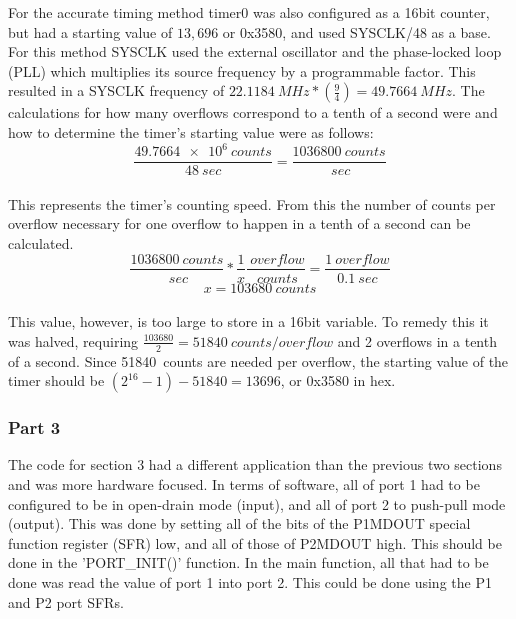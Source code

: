 \documentclass[12pt]{article}
\begin{document}
For the accurate timing method timer0 was also configured as a 16bit counter, but had a starting value of $13,696$ or 0x3580, and used SYSCLK/48 as a base. For this method SYSCLK used the external oscillator and the phase-locked loop (PLL) which multiplies its source frequency by a programmable factor. This resulted in a SYSCLK frequency of \begin{math}
	\SI{22.1184}{MHz}*\left(\frac{9}{4}\right) = \SI{49.7664}{MHz}
\end{math}.  The calculations for how many overflows correspond to a tenth of a second were and how to determine the timer's starting value were as follows:\\
\begin{equation}
	\frac{\SI{49.7664e6}{counts}}{\SI{48}{sec}} = \frac{\SI{1036800}{counts}}{\SI{}{sec}}
\end{equation}\\
This represents the timer's counting speed. From this the number of counts per overflow necessary for one overflow to happen in a tenth of a second can be calculated.\\
\begin{equation}
	\frac{\SI{1036800}{counts}}{\SI{}{sec}}*\frac{1}{x}\frac{\SI{}{overflow}}{\SI{}{counts}} = \frac{\SI{1}{overflow}}{\SI{0.1}{sec}}
\end{equation}
\begin{equation}
 x = \SI{103680}{counts}
\end{equation}\\
This value, however, is too large to store in a 16bit variable. To remedy this it was halved, requiring \begin{math}
	\frac{103680}{2} = \SI{51840}{counts\per overflow}
\end{math} and 2 overflows in a tenth of a second. Since \SI{51840}{counts} are needed per overflow, the starting value of the timer should be \begin{math}
(2^{16}-1)-51840 = 13696
\end{math}, or 0x3580 in hex.

\subsubsection{Part 3}
The code for section 3 had a different application than the previous two sections and was more hardware focused. In terms of software, all of port 1 had to be configured to be in open-drain mode (input), and all of port 2 to push-pull mode (output). This was done by setting all of the bits of the P1MDOUT special function register (SFR) low, and all of those of P2MDOUT high. This should be done in the 'PORT\_INIT()' function. In the main function, all that had to be done was read the value of port 1 into port 2. This could be done using the P1 and P2 port SFRs. 
\end{document}
